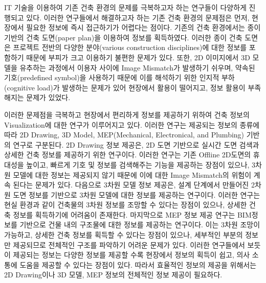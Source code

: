 
IT 기술을 이용하여 기존 건축 환경의 문제를 극복하고자 하는 연구들이 다양하게 진행되고 있다. 이러한 연구들에서 해결하고자 하는 기존 건축 환경의 문제점은 먼저, 현장에서 필요한 정보에 즉시 접근하기가 어렵다는 점이다\cite{yeh_-site_2012,cote_augmented_2013,chi_research_2013}. 기존의 건축 환경에서는 종이 기반의 건축 도면(paper plan)을 이용하여 정보를 획득하였다. 이러한 종이 건축 도면은 프로젝트 전반의 다양한 분야(various construction disciplines)에 대한 정보를 포함하기 때문에 부피가 크고 이용하기 불편한 문제가 있다\cite{yeh_-site_2012}. 또한, 2D 이미지에서 3D 모델을 유추하는 과정에서 이용자 사이에 Image Mismatch가 발생하기 쉬우며\cite{cote_augmented_2013,yeh_-site_2012}, 약속된 기호(predefined symbol)을 사용하기 때문에 이를 해석하기 위한 인지적 부하(cognitive load)가 발생하는 문제\cite{chi_research_2013}가 있어 현장에서 활용이 떨어지고, 정보 활용이 부족해지는 문제가 있었다. 

이러한 문제점을 극복하고 현장에서 편리하게 정보를 제공하기 위하여 건축 정보의 Visualization에 대한 연구가 이루어지고 있다. 이러한 연구는 제공되는 정보의 종류에 따라 2D Drawing, 3D Model, MEP(Mechanical, Electronical, and Plumbing) 기반의 연구로 구분된다\cite{ebbesen_information_2015}. 2D Drawing 정보 제공\cite{yeh_-site_2012,ishii_augmented_2002,cote_augmented_2013}은, 2D 도면 기반으로 실시간 도면 검색과 상세한 건축 정보를 제공하기 위한 연구이다. 이러한 연구는 기존 Offline 2D도면의 휴대성을 높이고, 빠르게 기호 및 정보를 검색해주는 기능을 제공하는 장점이 있으나, 3차원 모델에 대한 정보는 제공되지 않기 때문에 이에 대한 Image Mismatch의 위험이 계속 된다는 문제가 있다. 다음으로 3차원 모델 정보 제공은, 설계 단계에서 만들어진 2차원 도면 정보를 기반으로 3차원 모델에 대한 정보를 제공하는 연구이다\cite{wagner_building_2012,dong_collaborative_2013, hou_combining_2014,behzadan_ubiquitous_2008,williams_bim2mar:_2015}. 이러한 연구는 현실 환경과 같이 건축물의 3차원 정보를 조망할 수 있다는 장점이 있으나, 상세한 건축 정보를 획득하기에 어려움이 존재한다. 마지막으로 MEP 정보 제공 연구\cite{schall_handheld_2009,olbrich_augmented_2013,kwon_defect_2014,webster_augmented_????,golparvar-fard_d4ar4-dimensional_2009}는 BIM정보를 기반으로 건물 내의 구조물에 대한 정보를 제공하는 연구이다. 이는 3차원 조망이 가능하고, 상세한 건축 정보를 획득할 수 있다는 장점이 있으나, 세부적인 부분의 정보만 제공되므로 전체적인 구조를 파악하기 어려운 문제가 있다\cite{webster_augmented_????}. 이러한 연구들에서 보듯이 제공되는 정보는 다양한 정보를 제공할 수록 현장에서 정보의 획득이 쉽고, 의사 소통에 도움을 제공할 수 있다는 장점이 있다. 따라서 효율적인 정보의 제공을 위해서는 2D Drawing이나 3D 모델, MEP 정보의 전체적인 정보 제공이 필요하다. 

